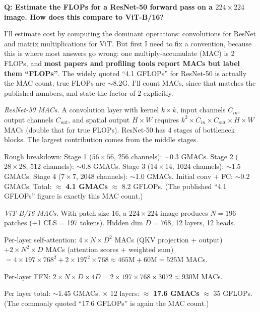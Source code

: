 \begin{interviewq}
\textbf{Q: Estimate the FLOPs for a ResNet-50 forward pass on a $224 \times 224$ image. How does this compare to ViT-B/16?}

 \quad {} \quad \badgefreq{\freqmed}

\stronganswer I'll estimate cost by computing the dominant operations: convolutions for ResNet and matrix multiplications for ViT. But first I need to fix a convention, because this is where most answers go wrong: one multiply-accumulate (MAC) is 2 FLOPs, and \textbf{most papers and profiling tools report MACs but label them ``FLOPs''}. The widely quoted ``4.1 GFLOPs'' for ResNet-50 is actually the MAC count; true FLOPs are $\sim$8.2G. I'll count MACs, since that matches the published numbers, and state the factor of 2 explicitly.

\textit{ResNet-50 MACs.} A convolution layer with kernel $k \times k$, input channels $C_{in}$, output channels $C_{out}$, and spatial output $H \times W$ requires $k^2 \times C_{in} \times C_{out} \times H \times W$ MACs (double that for true FLOPs). ResNet-50 has 4 stages of bottleneck blocks. The largest contribution comes from the middle stages.

Rough breakdown: Stage 1 ($56 \times 56$, 256 channels): $\sim$0.3 GMACs. Stage 2 ($28 \times 28$, 512 channels): $\sim$0.8 GMACs. Stage 3 ($14 \times 14$, 1024 channels): $\sim$1.5 GMACs. Stage 4 ($7 \times 7$, 2048 channels): $\sim$1.0 GMACs. Initial conv + FC: $\sim$0.2 GMACs. Total: $\approx$ \textbf{4.1 GMACs} $\approx$ 8.2 GFLOPs. (The published ``4.1 GFLOPs'' figure is exactly this MAC count.)

\textit{ViT-B/16 MACs.} With patch size 16, a $224 \times 224$ image produces $N = 196$ patches (+1 CLS = 197 tokens). Hidden dim $D = 768$, 12 layers, 12 heads.

Per-layer self-attention: $4 \times N \times D^2$ MACs (QKV projection + output) $+ 2 \times N^2 \times D$ MACs (attention scores + weighted sum) $= 4 \times 197 \times 768^2 + 2 \times 197^2 \times 768 \approx 465\text{M} + 60\text{M} = 525\text{M}$ MACs.

Per-layer FFN: $2 \times N \times D \times 4D = 2 \times 197 \times 768 \times 3072 \approx 930\text{M}$ MACs.

Per layer total: $\sim$1.45 GMACs. $\times$ 12 layers: $\approx$ \textbf{17.6 GMACs} $\approx$ 35 GFLOPs. (The commonly quoted ``17.6 GFLOPs'' is again the MAC count.)


\end{interviewq}
